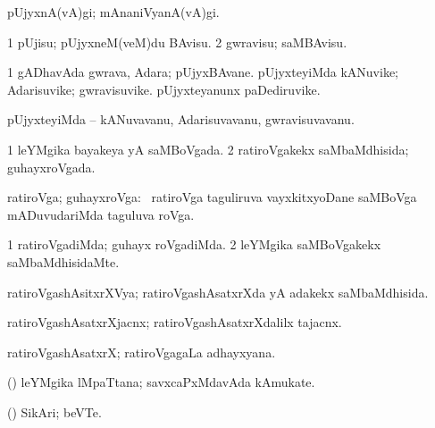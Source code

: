 \bentry
{} 
\gl{\nA}
\expl{}
\bmng
\emng
\eentry

\bentry
{} 
\gl{\kirxvi}
\expl{}
\bmng
 pUjyxnA(vA)gi; mAnaniVyanA(vA)gi. 
\emng
\eentry

\bentry
{} 
\gl{\sakirx}
\expl{}
\bmng
\bnum
\num{1} pUjisu; pUjyxneM(veM)du BAvisu. 
\num{2} gwravisu; saMBAvisu. 
\enum
\emng
\eentry

\bentry
{} 
\gl{\nA}
\expl{}
\bmng
\bnum
\num{1} gADhavAda gwrava, Adara; pUjyxBAvane. 
\banum
{} pUjyxteyiMda kANuvike; Adarisuvike; gwravisuvike. 
 pUjyxteyanunx paDediruvike. 
\eanum
\numie
\enum
\emng
\eentry

\bentry
{} 
\gl{\nA}
\expl{}
\bmng
 pUjyxteyiMda -- kANuvavanu, Adarisuvavanu, gwravisuvavanu. 
\emng
\eentry

\bentry
{} 
\gl{\gu}
\expl{}
\bmng
\bnum
\num{1} leYMgika bayakeya yA saMBoVgada. 
\num{2} ratiroVgakekx saMbaMdhisida; guhayxroVgada. 
\enum
\emng
\eentry

\bentry
{}
\gl{\nA}
\expl{}
\bmng
 ratiroVga; guhayxroVga: \kanmu\ ratiroVga taguliruva vayxkitxyoDane saMBoVga mADuvudariMda taguluva roVga. 
\emng
\eentry

\bentry
{} 
\gl{\kirxvi}
\expl{}
\bmng
\bnum
\num{1} ratiroVgadiMda; guhayx roVgadiMda. 
\num{2} leYMgika saMBoVgakekx saMbaMdhisidaMte. 
\enum
\emng
\eentry

\bentry
{} 
\gl{\gu}
\expl{}
\bmng
 ratiroVgashAsitxrXVya; ratiroVgashAsatxrXda yA adakekx saMbaMdhisida. 
\emng
\eentry

\bentry
{} 
\gl{\nA}
\expl{}
\bmng
 ratiroVgashAsatxrXjacnx; ratiroVgashAsatxrXdalilx tajacnx. 
\emng
\eentry

\bentry
{} 
\gl{\nA}
\expl{}
\bmng
 ratiroVgashAsatxrX; ratiroVgagaLa adhayxyana. 
\emng
\eentry

\bentry
{} 
\gl{\nA}
\expl{}
\bmng
 (\pArxparx) leYMgika lMpaTtana; savxcaPxMdavAda kAmukate. 
\emng
\eentry

\bentry
{} 
\gl{\nA}
\expl{}
\bmng
 (\pArxparx) SikAri; beVTe. 
\emng
\eentry

